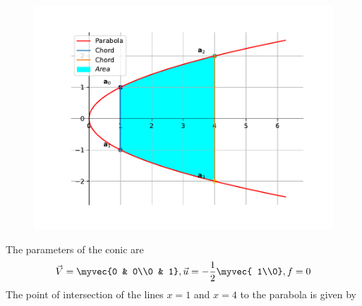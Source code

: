 	\begin{figure}[H]
		\centering
 \includegraphics[width=0.75\columnwidth]{chapters/12/8/1/1/figs/fig.pdf}
		\caption{}
		\label{fig:12/8/1/1}
  	\end{figure}

The parameters of the conic are
\begin{align}
	\vec{V} = \myvec{0 & 0\\0 & 1},
	\vec{u} = -\frac{1}{2}\myvec{ 1\\0},
	f = 0
\end{align}
\iffalse
The point of intersection of the lines $x=1$ and $x=4$ to the parabola is given by


